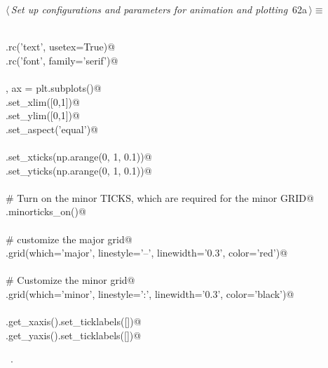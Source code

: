 \documentclass[11.5pt]{report}
\begin{document}
\begin{flushleft} \small
\begin{minipage}{\linewidth}\label{scrap93}\raggedright\small
{} $\langle\,${\itshape Set up configurations and parameters for animation and plotting}\nobreak\ {\footnotesize {62a}}$\,\rangle\equiv$
\vspace{-1ex}
\begin{list}{}{} \item
\mbox{}\verb@@\\
\mbox{}\verb@plt.rc('text', usetex=True)@\\
\mbox{}\verb@plt.rc('font', family='serif')@\\
\mbox{}\verb@@\\
\mbox{}\verb@fig, ax = plt.subplots()@\\
\mbox{}\verb@ax.set_xlim([0,1])@\\
\mbox{}\verb@ax.set_ylim([0,1])@\\
\mbox{}\verb@ax.set_aspect('equal')@\\
\mbox{}\verb@@\\
\mbox{}\verb@ax.set_xticks(np.arange(0, 1, 0.1))@\\
\mbox{}\verb@ax.set_yticks(np.arange(0, 1, 0.1))@\\
\mbox{}\verb@@\\
\mbox{}\verb@# Turn on the minor TICKS, which are required for the minor GRID@\\
\mbox{}\verb@ax.minorticks_on()@\\
\mbox{}\verb@@\\
\mbox{}\verb@# customize the major grid@\\
\mbox{}\verb@ax.grid(which='major', linestyle='--', linewidth='0.3', color='red')@\\
\mbox{}\verb@@\\
\mbox{}\verb@# Customize the minor grid@\\
\mbox{}\verb@ax.grid(which='minor', linestyle=':', linewidth='0.3', color='black')@\\
\mbox{}\verb@@\\
\mbox{}\verb@ax.get_xaxis().set_ticklabels([])@\\
\mbox{}\verb@ax.get_yaxis().set_ticklabels([])@\\
\mbox{}\verb@@{\NWsep}
\end{list}
\vspace{-1.5ex}
\footnotesize
\begin{list}{}{\setlength{\itemsep}{-\parsep}\setlength{\itemindent}{-\leftmargin}}
\item \NWtxtMacroRefIn\ .

\item{}
\end{list}
\end{minipage}\vspace{4ex}
\end{flushleft}
\end{document}
